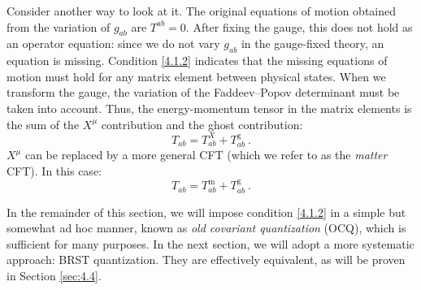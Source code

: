 Consider another way to look at it. The original equations of motion obtained from the variation of $g_{a b}$ are $T^{a b}=0$. After fixing the gauge, this does not hold as an operator equation: since we do not vary $g_{a b}$ in the gauge-fixed theory, an equation is missing.
Condition \eqref{4.1.2} indicates that the missing equations of motion must hold for any matrix element between physical states. When we transform the gauge, the variation of the Faddeev–Popov determinant must be taken into account. Thus, the energy-momentum tensor in the matrix elements is the sum of the $X^\mu$ contribution and the ghost contribution:
\begin{equation}
	T_{a b}=T_{a b}^{X}+T_{a b}^{\mathrm{g}} \:. \label{4.1.3}
\end{equation}
$X^\mu$ can be replaced by a more general CFT (which we refer to as the \emph{matter} CFT). In this case:
\begin{equation}
	T_{a b}=T_{a b}^{\mathrm{m}}+T_{a b}^{\mathrm{g}} \:. \label{4.1.4}
\end{equation}

In the remainder of this section, we will impose condition \eqref{4.1.2} in a simple but somewhat ad hoc manner, known as \emph{old covariant quantization} (OCQ), which is sufficient for many purposes.
In the next section, we will adopt a more systematic approach: BRST quantization. They are effectively equivalent, as will be proven in Section \ref{sec:4.4}.

